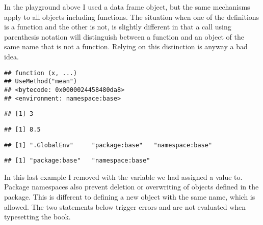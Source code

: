\documentclass[krantz2]{krantz}\usepackage{knitr}
\begin{document}
\begin{warningbox}
In the playground above I used a data frame object, but the same mechanisms apply to all \Rlang objects including functions. The situation when one of the definitions is a function and the other is not, is slightly different in that a call using parenthesis notation will distinguish between a function and an object of the same name that is not a function. Relying on this distinction is anyway a bad idea.

\begin{knitrout}\footnotesize
{}\color{fgcolor}\begin{kframe}
\begin{alltt}
\end{alltt}
\begin{verbatim}
## function (x, ...) 
## UseMethod("mean")
## <bytecode: 0x0000024458480da8>
## <environment: namespace:base>
\end{verbatim}
\begin{alltt}
 \hlkwb{<-} \hlstd{(}\hlopt{:}\hlstd{)}
\end{alltt}
\begin{verbatim}
## [1] 3
\end{verbatim}
\begin{alltt}
\hlstd{(}\hlopt{:}\hlstd{)}
\end{alltt}
\begin{verbatim}
## [1] 8.5
\end{verbatim}
\begin{alltt}
\hlstd{(}\hlstd{)}\hlopt{$}
\end{alltt}
\begin{verbatim}
## [1] ".GlobalEnv"     "package:base"   "namespace:base"
\end{verbatim}
\begin{alltt}
\hlstd{(}\hlstd{)}\hlopt{$}
\end{alltt}
\begin{verbatim}
## [1] "package:base"   "namespace:base"
\end{verbatim}
\end{kframe}
\end{knitrout}

In this last example I removed with  the variable we had assigned a value to. Package namespaces also prevent deletion or overwriting of objects defined in the package. This is different to defining a new object with the same name, which is allowed. The two statements below trigger errors and are not evaluated when typesetting the book.


\end{warningbox}
\end{document}

